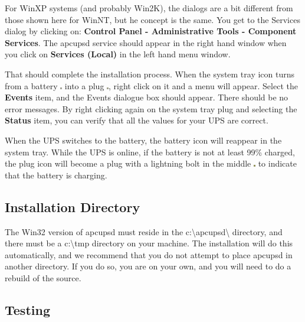 {{{{{{{{{{For WinXP systems (and probably Win2K), the dialogs are a bit different from
those shown here for WinNT, but he concept is the same. You get to the
Services dialog by clicking on: {\bf Control Panel -\gt{} Administrative Tools
-\gt{} Component Services}. The apcupsd service should appear in the right
hand window when you click on {\bf Services (Local)} in the left hand menu
window.  

That should complete the installation process. When the system tray icon turns
from a battery \includegraphics{./onbatt.eps} into a plug
\includegraphics{./online.eps}, right click on it and a menu will appear.
Select the {\bf Events} item, and the Events dialogue box should appear. There
should be no error messages. By right clicking again on the system tray plug
and selecting the {\bf Status} item, you can verify that all the values for
your UPS are correct.  

When the UPS switches to the battery, the battery icon will reappear in the
system tray. While the UPS is online, if the battery is not at least 99\%
charged, the plug icon will become a plug with a lightning bolt in the middle
\includegraphics{./charging.eps} to indicate that the battery is charging. 

\label{Installation-Directory}

\subsection*{Installation Directory}

\label{index-Windows_002c-Installation-Directory-172}
The Win32 version of apcupsd must reside in the
c:\textbackslash{}apcupsd\textbackslash{} directory, and there must be a
c:\textbackslash{}tmp directory on your machine. The installation will do this
automatically, and we recommend that you do not attempt to place apcupsd in
another directory. If you do so, you are on your own, and you will need to do
a rebuild of the source. 

\label{Testing}

\subsection*{Testing}

}}}}}}}}}}

